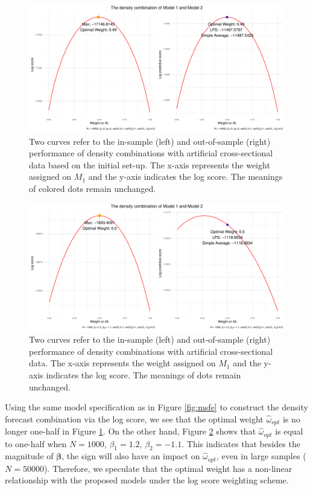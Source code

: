 \documentclass{monashthesis}
\begin{document}
\begin{figure}[ht]
\centering
\includegraphics[scale=0.6]{figures/LPS_10000.pdf}
\caption{Two curves refer to the in-sample (left) and out-of-sample (right) performance of density combinations with artificial cross-sectional data based on the initial set-up. The x-axis represents the weight assigned on $M_1$ and the y-axis indicates the log score. The meanings of colored dots remain unchanged.}
\label{fig:ss10000}
\end{figure}

\begin{figure}[ht]
\centering
\includegraphics[scale=0.6]{figures/LPS_1000.pdf}
\caption{Two curves refer to the in-sample (left) and out-of-sample (right) performance of density combinations with artificial cross-sectional data. The x-axis represents the weight assigned on $M_1$ and the y-axis indicates the log score. The meanings of dots remain unchanged.}
\label{fig:ss1000}
\end{figure}

Using the same model specification as in Figure \ref{fig:msfe} to construct the density forecast combination via the log score, we see that the optimal weight \(\hat\omega_{opt}\) is no longer one-half in Figure \ref{fig:ss10000}. On the other hand, Figure \ref{fig:ss1000} shows that \(\hat\omega_{opt}\) is equal to one-half when \(N = 1000\), \(\beta_1=1.2\), \(\beta_2=-1.1\). This indicates that besides the magnitude of \(\pmb{\beta}\), the sign will also have an impact on \(\hat\omega_{opt}\), even in large samples (\(N = 50000\)). Therefore, we speculate that the optimal weight has a non-linear relationship with the proposed models under the log score weighting scheme.
\end{document}
